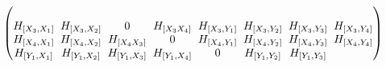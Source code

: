 \documentclass[pdftex]{sigma}
\numberwithin{equation}{section}
\theoremstyle{definition}
\newcommand{\0}{\boldsymbol{0}}
\begin{document}
\begin{gather*}
\begin{pmatrix}
\\
H_{[X_3, X_1]} \hspace{-2.3pt}&\hspace{-2.3pt} H_{[X_3, X_2]} \hspace{-2.3pt}&\hspace{-2.3pt} 0 \hspace{-2.3pt}&\hspace{-2.3pt} H_{[X_3 X_4]} \hspace{-2.3pt}&\hspace{-2.3pt} H_{[X_3, Y_1]} \hspace{-2.3pt}&\hspace{-2.3pt} H_{[X_3, Y_2]} \hspace{-2.3pt}&\hspace{-2.3pt} H_{[X_3, Y_3]} \hspace{-2.3pt}&\hspace{-2.3pt}
H_{[X_3, Y_4]}
\\
H_{[X_4, X_1]} \hspace{-2.3pt}&\hspace{-2.3pt} H_{[X_4, X_2]} \hspace{-2.3pt}&\hspace{-2.3pt} H_{[X_4 X_3]} \hspace{-2.3pt}&\hspace{-2.3pt} 0 \hspace{-2.3pt}&\hspace{-2.3pt} H_{[X_4, Y_1]} \hspace{-2.3pt}&\hspace{-2.3pt} H_{[X_4, Y_2]} \hspace{-2.3pt}&\hspace{-2.3pt} H_{[X_4, Y_3]} \hspace{-2.3pt}&\hspace{-2.3pt}
H_{[X_4, Y_4]}
\\
H_{[Y_1, X_1]} \hspace{-2.3pt}&\hspace{-2.3pt} H_{[Y_1, X_2]} \hspace{-2.3pt}&\hspace{-2.3pt} H_{[Y_1, X_3]} \hspace{-2.3pt}&\hspace{-2.3pt} H_{[Y_1, X_4]} \hspace{-2.3pt}&\hspace{-2.3pt} 0 \hspace{-2.3pt}&\hspace{-2.3pt} H_{[Y_1, Y_2]} \hspace{-2.3pt}&\hspace{-2.3pt} H_{[Y_1, Y_3]} \hspace{-2.3pt}&\hspace{-2.3pt}

\end{pmatrix}
\end{gather*}
\end{document}
